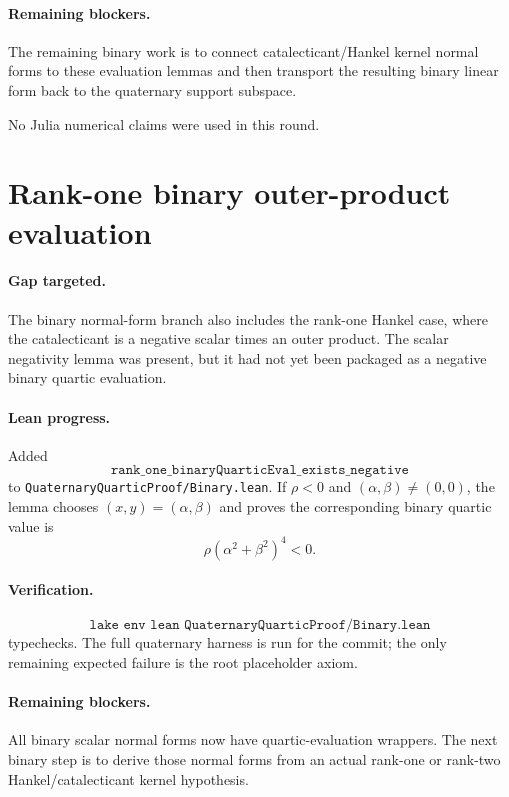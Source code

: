 \documentclass[11pt]{article}
\begin{document}
\paragraph{Remaining blockers.}
The remaining binary work is to connect catalecticant/Hankel kernel normal
forms to these evaluation lemmas and then transport the resulting binary linear
form back to the quaternary support subspace.

No Julia numerical claims were used in this round.

\section*{Rank-one binary outer-product evaluation}

\paragraph{Gap targeted.}
The binary normal-form branch also includes the rank-one Hankel case, where the
catalecticant is a negative scalar times an outer product.  The scalar
negativity lemma was present, but it had not yet been packaged as a negative
binary quartic evaluation.

\paragraph{Lean progress.}
Added
\[
\texttt{rank\_one\_binaryQuarticEval\_exists\_negative}
\]
to \texttt{QuaternaryQuarticProof/Binary.lean}.  If
\(\rho<0\) and \((\alpha,\beta)\ne(0,0)\), the lemma chooses
\((x,y)=(\alpha,\beta)\) and proves the corresponding binary quartic value is
\[
\rho(\alpha^2+\beta^2)^4<0.
\]

\paragraph{Verification.}
\[
\texttt{lake env lean QuaternaryQuarticProof/Binary.lean}
\]
typechecks.  The full quaternary harness is run for the commit; the only
remaining expected failure is the root placeholder axiom.

\paragraph{Remaining blockers.}
All binary scalar normal forms now have quartic-evaluation wrappers.  The next
binary step is to derive those normal forms from an actual rank-one or rank-two
Hankel/catalecticant kernel hypothesis.
\end{document}
